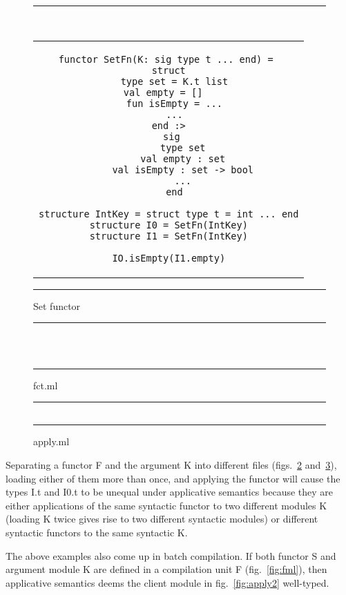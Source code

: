 \begin{figure}
\hrule
~
\begin{center}
\begin{tabular}{c}
\begin{lstlisting}
functor SetFn(K: sig type t ... end) = 
struct
  type set = K.t list
  val empty = [] 	
  fun isEmpty = ...
  ...
end :>
  sig 
     type set
     val empty : set
     val isEmpty : set -> bool
     ...
  end

structure IntKey = struct type t = int ... end
structure I0 = SetFn(IntKey)
structure I1 = SetFn(IntKey)

IO.isEmpty(I1.empty)
\end{lstlisting}
\end{tabular}
\end{center}
\hrule
\caption{Set functor}
\label{fig:setfunctor}
\end{figure}

\lstset{language=[Objective]caml}
\begin{figure}
\hrule
~
\begin{center}
\begin{tabular}{c}

\end{tabular}
\end{center}
\hrule
\caption{fct.ml}
\label{fig:fctml}
\end{figure}

\begin{figure}
\hrule
\begin{center}
\begin{tabular}{c}

\end{tabular}
\end{center}
\hrule
\caption{apply.ml }
\label{fig:apply1}
\end{figure}

Separating a functor F and the argument K into different files (figs.~\ref{fig:fctml} and~\ref{fig:apply1}), loading either of them more than once, and applying the functor will cause the types I.t and I0.t to be unequal under applicative semantics because they are either applications of the same syntactic functor to two different modules K (loading K twice gives rise to two different syntactic modules) or different syntactic functors to the same syntactic K.  

The above examples also come up in batch compilation. If both functor S and argument module K are defined in a compilation unit F (fig.~\ref{fig:fml}), then applicative semantics deems the client module in fig.~\ref{fig:apply2} well-typed.

